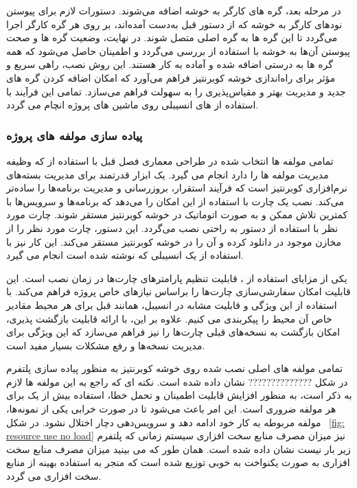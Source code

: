 در مرحله بعد، گره های کارگر به خوشه اضافه می‌شوند. دستورات لازم برای پیوستن نودهای کارگر به خوشه که از دستور قبل به‌دست آمده‌اند، بر روی هر گره کارگر اجرا می‌گردد تا این گره ها به گره اصلی متصل شوند. در نهایت، وضعیت گره ها و صحت پیوستن آن‌ها به خوشه با استفاده از  بررسی می‌گردد و اطمینان حاصل می‌شود که همه گره ها به درستی اضافه شده و آماده به کار هستند. این روش نصب، راهی سریع و مؤثر برای راه‌اندازی خوشه کوبرنتیز فراهم می‌آورد که امکان اضافه کردن گره  های جدید و مدیریت بهتر و مقیاس‌پذیری را به سهولت فراهم می‌سازد. تمامی این فرآیند با استفاده از  های انسیبلی روی ماشین های پروژه انچام می گردد.

\subsubsection{پیاده سازی مولفه های پروژه}
تمامی مولفه ها انتخاب شده در طراحی معماری فصل قبل با استفاده از  که وظیفه مدیریت مولفه ها را دارد انجام می گیرد.  یک ابزار قدرتمند برای مدیریت بسته‌های نرم‌افزاری کوبرنتیز است که فرآیند استقرار، بروزرسانی و مدیریت برنامه‌ها را ساده‌تر می‌کند. نصب یک چارت با استفاده از  این امکان را می‌دهد که برنامه‌ها و سرویس‌ها با کمترین تلاش ممکن و به صورت اتوماتیک در خوشه کوبرنتیز مستقر شوند. چارت مورد نظر با استفاده از دستور  به راحتی نصب می‌گردد. این دستور، چارت مورد نظر را از مخازن موجود در  دانلود کرده و آن را در خوشه کوبرنتیز مستقر می‌کند. این کار نیز با استفاده از یک  انسیبلی که نوشته شده است انجام می گیرد. 

یکی از مزایای استفاده از ، قابلیت تنظیم پارامترهای چارت‌ها در زمان نصب است. این قابلیت امکان سفارشی‌سازی چارت‌ها را براساس نیازهای خاص پروژه فراهم می‌کند. با استفاده از این ویژگی و قابلیت مشابه در انسیبل، همانند قبل برای هر محیط مقادیر خاص آن محیط را پیکربندی می کنیم. علاوه بر این،  با ارائه قابلیت بازگشت پذیری، امکان بازگشت به نسخه‌های قبلی چارت‌ها را نیز فراهم می‌سازد که این ویژگی برای مدیریت نسخه‌ها و رفع مشکلات بسیار مفید است. 

تمامی مولفه های اصلی نصب شده روی خوشه کوبرنتیز به منظور پیاده سازی پلتفرم  در شکل
??????????????
 نشان داده شده است. نکته ای که راجع به این مولفه ها لازم به ذکر است، به منظور افزایش قابلیت اطمینان و تحمل خطا، استفاده بیش از یک  برای هر مولفه ضروری است. این امر باعث می‌شود تا در صورت خرابی یکی از نمونه‌ها، مولفه مربوطه به کار خود ادامه دهد و سرویس‌دهی دچار اختلال نشود.
در شکل 
~\ref{fig: resource use no load}
نیز میزان مصرف منابع سخت افزاری سیستم زمانی که پلتفرم زیر بار نیست نشان داده شده است. همان طور که می بینید میزان مصرف منابع سخت افزاری به صورت یکنواخت به خوبی توزیع شده است که منجر به استفاده بهینه از منابع سخت افزاری می گردد.

